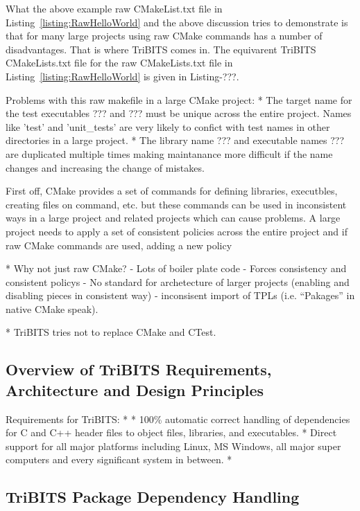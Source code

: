 \documentclass[10pt]{article}
\begin{document}
What the above example raw CMakeList.txt file in Listing~\ref{listing:RawHelloWorld} and the above discussion tries to demonstrate is that for many large projects using raw CMake commands has a number of disadvantages.  That is where TriBITS comes in.  The equivarent TriBITS CMakeLists.txt file for the raw CMakeLists.txt file in Listing~\ref{listing:RawHelloWorld} is given in Listing-???.






Problems with this raw makefile in a large CMake project:
* The target name for the test executables ??? and ??? must be unique across the entire project.  Names like 'test' and 'unit\_tests' are very likely to confict with test names in other directories in a large project.
* The library name ??? and executable names ??? are duplicated multiple times making maintanance more difficult if the name changes and increasing the change of mistakes.




First off, CMake provides a set of commands for defining libraries, executbles, creating files on command, etc. but these commands can be used in inconsistent ways in a large project and related projects which can cause problems.  A large project needs to apply a set of consistent policies across the entire project and if raw CMake commands are used, adding a new policy 

* Why not just raw CMake?
  - Lots of boiler plate code
  - Forces consistency and consistent policys
  - No standard for archetecture of larger projects (enabling and disabling pieces in consistent way)
  - inconsisent import of TPLs (i.e. ``Pakages'' in native CMake speak).

* TriBITS tries not to replace CMake and CTest.

%
\subsection{Overview of TriBITS Requirements, Architecture and Design Principles}
%

Requirements for TriBITS:
* 
* 100\% automatic correct handling of dependencies for C and C++ header files to object files, libraries, and executables.
* Direct support for all major platforms including Linux, MS Windows,  all major super computers and every significant system in between.
* 




%
\subsection{TriBITS Package Dependency Handling}
%
\end{document}
